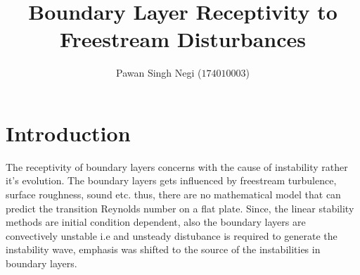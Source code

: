 \documentclass[twoside]{iitbreport}
\begin{document}
\setcounter{page}{1}

\title{Boundary Layer Receptivity to Freestream Disturbances}
\author{Pawan Singh Negi ($174010003$) }











\maketitle
\tableofcontents

\pagebreak
\section{Introduction}
\label{intro}
The receptivity of boundary layers concerns with the cause of instability
rather it's evolution. The boundary layers gets influenced by freestream
turbulence, surface roughness, sound etc. thus, there are no mathematical
model that can predict the transition Reynolds number on a flat plate.
Since, the linear stability methods are initial condition dependent, also
the boundary layers are convectively unstable i.e and unsteady distubance
is required to generate the instability wave, emphasis was shifted to the
source of the instabilities in boundary layers.
\end{document}
